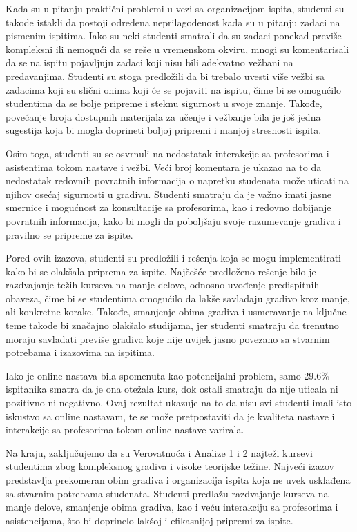 \documentclass[a4paper]{article}
\begin{document}
Kada su u pitanju praktični problemi u vezi sa organizacijom ispita, studenti su takođe istakli da postoji određena neprilagođenost kada su u pitanju zadaci na pismenim ispitima. Iako su neki studenti smatrali da su zadaci ponekad previše kompleksni ili nemogući da se reše u vremenskom okviru, mnogi su komentarisali da se na ispitu pojavljuju zadaci koji nisu bili adekvatno vežbani na predavanjima. Studenti su stoga predložili da bi trebalo uvesti više vežbi sa zadacima koji su slični onima koji će se pojaviti na ispitu, čime bi se omogućilo studentima da se bolje pripreme i steknu sigurnost u svoje znanje. Takođe, povećanje broja dostupnih materijala za učenje i vežbanje bila je još jedna sugestija koja bi mogla doprineti boljoj pripremi i manjoj stresnosti ispita.

Osim toga, studenti su se osvrnuli na nedostatak interakcije sa profesorima i asistentima tokom nastave i vežbi. Veći broj komentara je ukazao na to da nedostatak redovnih povratnih informacija o napretku studenata može uticati na njihov osećaj sigurnosti u gradivu. Studenti smatraju da je važno imati jasne smernice i mogućnost za konsultacije sa profesorima, kao i redovno dobijanje povratnih informacija, kako bi mogli da poboljšaju svoje razumevanje gradiva i pravilno se pripreme za ispite.

Pored ovih izazova, studenti su predložili i rešenja koja se mogu implementirati kako bi se olakšala priprema za ispite. Najčešće predloženo rešenje bilo je razdvajanje težih kurseva na manje delove, odnosno uvođenje predispitnih obaveza, čime bi se studentima omogućilo da lakše savladaju gradivo kroz manje, ali konkretne korake. Takođe, smanjenje obima gradiva i usmeravanje na ključne teme takođe bi značajno olakšalo studijama, jer studenti smatraju da trenutno moraju savladati previše gradiva koje nije uvijek jasno povezano sa stvarnim potrebama i izazovima na ispitima.

Iako je online nastava bila spomenuta kao potencijalni problem, samo 29.6\% ispitanika smatra da je ona otežala kurs, dok ostali smatraju da nije uticala ni pozitivno ni negativno. Ovaj rezultat ukazuje na to da nisu svi studenti imali isto iskustvo sa online nastavam, te se može pretpostaviti da je kvaliteta nastave i interakcije sa profesorima tokom online nastave varirala.

Na kraju, zaključujemo da su Verovatnoća i Analize 1 i 2 najteži kursevi studentima zbog kompleksnog gradiva i visoke teorijske težine. Najveći izazov predstavlja prekomeran obim gradiva i organizacija ispita koja ne uvek usklađena sa stvarnim potrebama studenata. Studenti predlažu razdvajanje kurseva na manje delove, smanjenje obima gradiva, kao i veću interakciju sa profesorima i asistencijama, što bi doprinelo lakšoj i efikasnijoj pripremi za ispite.
\end{document}
